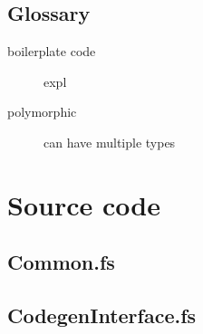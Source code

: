 \documentclass[10pt,a4paper]{article}
\begin{document}
\pagestyle{empty} 


\newpage

\setcounter{secnumdepth}{2} 
\setcounter{tocdepth}{2}


\setcounter{page}{1}
\pagestyle{plain}

\begin{multicols}{2}
\tableofcontents
\columnbreak




















\printbibliography
\end{multicols}
\newpage

\setcounter{section}{0}
\renewcommand\thesection{\Alph{section}}



\begin{multicols}{2}
\section{Glossary}
\begin{description}
    \item[boilerplate code] expl
    \item[polymorphic] can have multiple types
\end{description}
\end{multicols}
\newpage


\section{Source code}
\subsection{Common.fs} 

\subsection{CodegenInterface.fs} 

\end{document}
